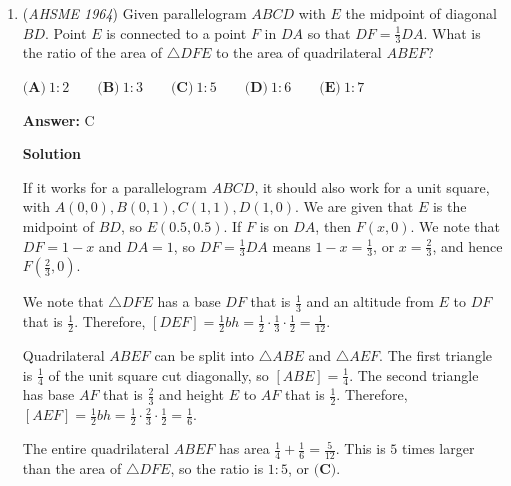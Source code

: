 \begin{enumerate}
 By the definition of a logarithm, the first term on the left is asking for the exponent $x$ needed to change the number $b^2$ into $(b^2)^x$ to get to $b^n$.  That exponent is $\frac{n}{2}$.

 The second term is asking for a similar exponent needed to change $b^{2n}$ into $b$.  That exponent is $\frac{1}{2n}$.

 The equation becomes $\frac{n}{2} + \frac{1}{2n} = 1$.  Multiplying by $2n$ gives the quadratic $n^2 + 1 = 2n$, which has the solution $n=1$.  Thus, $x = b^n = b^1$, and the answer is $\boxed{\textbf{(D)}}$.

 


	\item (\textit{AHSME 1964}) Given parallelogram $ABCD$ with $E$ the midpoint of diagonal $BD$. Point $E$ is connected to a point $F$ in $DA$ so that 
$DF=\frac{1}{3}DA$. What is the ratio of the area of $\triangle DFE$ to the area of quadrilateral $ABEF$?


 $\textbf{(A)}\ 1:2 \qquad \textbf{(B)}\ 1:3 \qquad \textbf{(C)}\ 1:5 \qquad \textbf{(D)}\ 1:6 \qquad \textbf{(E)}\ 1:7$

 \textbf{Answer: }C



\textbf{Solution}

If it works for a parallelogram $ABCD$, it should also work for a unit square, with $A(0, 0), B(0, 1), C(1, 1), D(1, 0)$.  We are given that $E$ is the midpoint of $BD$, so $E(0.5, 0.5)$.  If $F$ is on $DA$, then $F(x, 0)$.  We note that $DF = 1-x$ and $DA = 1$, so $DF = \frac{1}{3}DA$ means $1-x = \frac{1}{3}$, or $x = \frac{2}{3}$, and hence $F(\frac{2}{3}, 0)$.

 We note that $\triangle DFE$ has a base $DF$ that is $\frac{1}{3}$ and an altitude from $E$ to $DF$ that is $\frac{1}{2}$.  Therefore, $[DEF] = \frac{1}{2}bh = \frac{1}{2} \cdot \frac{1}{3} \cdot \frac{1}{2} = \frac{1}{12}$.

 Quadrilateral $ABEF$ can be split into $\triangle ABE$ and $\triangle AEF$.  The first triangle is $\frac{1}{4}$ of the unit square cut diagonally, so $[ABE] = \frac{1}{4}$.  The second triangle has base $AF$ that is $\frac{2}{3}$ and height $E$ to $AF$ that is $\frac{1}{2}$.  Therefore, $[AEF] = \frac{1}{2}bh = \frac{1}{2} \cdot \frac{2}{3} \cdot \frac{1}{2} = \frac{1}{6}$.

 The entire quadrilateral $ABEF$ has area $\frac{1}{4} + \frac{1}{6} = \frac{5}{12}$.  This is $5$ times larger than the area of $\triangle DFE$, so the ratio is $1:5$, or $\boxed{\textbf{(C)}}$.


\end{enumerate}
